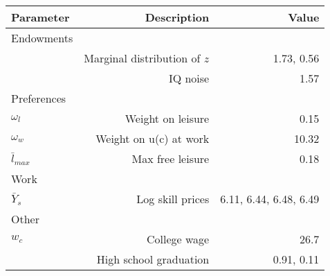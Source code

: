 \begin{tabular}{lrr}
\hline
Parameter & Description  & Value  \\ 
\hline
Endowments &   &   \\ 
 & Marginal distribution of $z$  & 1.73, 0.56  \\ 
 & IQ noise  & 1.57  \\ 
Preferences &   &   \\ 
$\omega_{l}$ & Weight on leisure  & 0.15  \\ 
$\omega_{w}$ & Weight on u(c) at work  & 10.32  \\ 
$\bar{l}_{max}$ & Max free leisure  & 0.18  \\ 
Work &   &   \\ 
$\bar{Y}_{s}$ & Log skill prices  & 6.11, 6.44, 6.48, 6.49  \\ 
Other &   &   \\ 
$w_{c}$ & College wage  & 26.7  \\ 
 & High school graduation  & 0.91, 0.11  \\ 
\hline
\end{tabular}%
